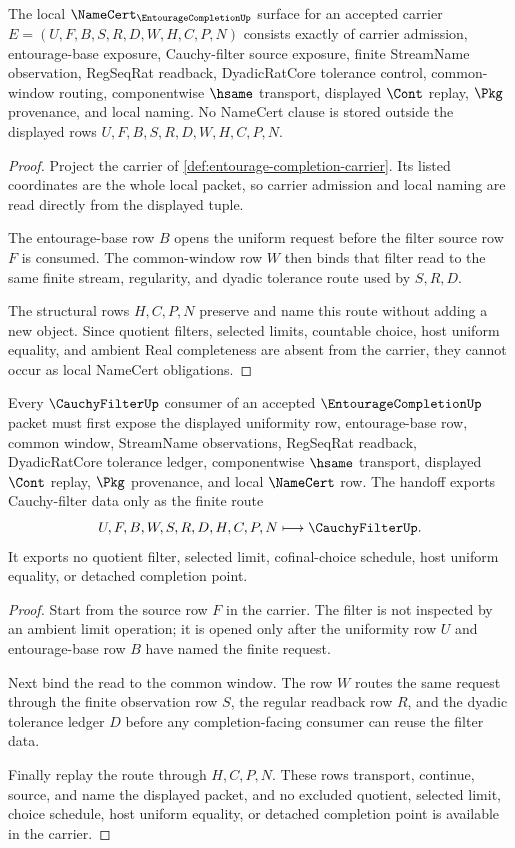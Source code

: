 \begin{theorem}
\label{thm:entourage-completion-namecert-obligations}
The local $\NameCert_{\EntourageCompletionUp}$ surface for an accepted carrier
$E=(U,F,B,S,R,D,W,H,C,P,N)$ consists exactly of carrier admission, entourage-base
exposure, Cauchy-filter source exposure, finite StreamName observation,
RegSeqRat readback, DyadicRatCore tolerance control, common-window routing,
componentwise $\hsame$ transport, displayed $\Cont$ replay, $\Pkg$ provenance,
and local naming. No NameCert clause is stored outside the displayed rows
$U,F,B,S,R,D,W,H,C,P,N$.
\end{theorem}
\begin{proof}
Project the carrier of \autoref{def:entourage-completion-carrier}. Its listed
coordinates are the whole local packet, so carrier admission and local naming
are read directly from the displayed tuple.

The entourage-base row $B$ opens the uniform request before the filter source
row $F$ is consumed. The common-window row $W$ then binds that filter read to
the same finite stream, regularity, and dyadic tolerance route used by
$S,R,D$.

The structural rows $H,C,P,N$ preserve and name this route without adding a
new object. Since quotient filters, selected limits, countable choice, host
uniform equality, and ambient Real completeness are absent from the carrier,
they cannot occur as local NameCert obligations.
\end{proof}

\begin{theorem}
\label{thm:entourage-completion-cauchy-filter-handoff}
Every $\CauchyFilterUp$ consumer of an accepted $\EntourageCompletionUp$ packet
must first expose the displayed uniformity row, entourage-base row, common
window, StreamName observations, RegSeqRat readback, DyadicRatCore tolerance
ledger, componentwise $\hsame$ transport, displayed $\Cont$ replay, $\Pkg$
provenance, and local $\NameCert$ row. The handoff exports Cauchy-filter data
only as the finite route
$$
U,F,B,W,S,R,D,H,C,P,N \longmapsto \CauchyFilterUp .
$$
It exports no quotient filter, selected limit, cofinal-choice schedule, host
uniform equality, or detached completion point.
\end{theorem}
\begin{proof}
Start from the source row $F$ in the carrier. The filter is not inspected by an
ambient limit operation; it is opened only after the uniformity row $U$ and
entourage-base row $B$ have named the finite request.

Next bind the read to the common window. The row $W$ routes the same request
through the finite observation row $S$, the regular readback row $R$, and the
dyadic tolerance ledger $D$ before any completion-facing consumer can reuse the
filter data.

Finally replay the route through $H,C,P,N$. These rows transport, continue,
source, and name the displayed packet, and no excluded quotient, selected
limit, choice schedule, host uniform equality, or detached completion point is
available in the carrier.
\end{proof}

